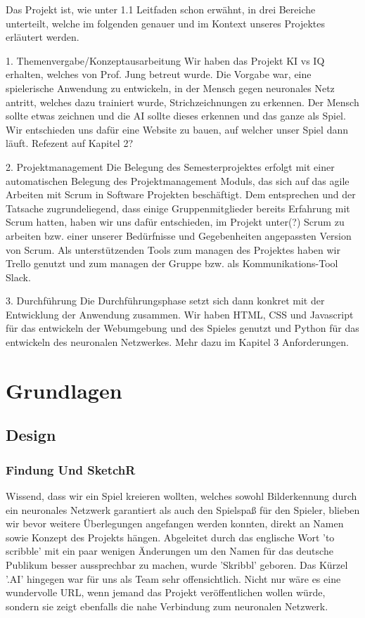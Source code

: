 \documentclass[11pt]{article}
\begin{document}
Das Projekt ist, wie unter 1.1 Leitfaden schon erwähnt, in drei Bereiche unterteilt, welche im folgenden genauer und im Kontext unseres Projektes erläutert werden.

1. Themenvergabe/Konzeptausarbeitung
	Wir haben das Projekt KI vs IQ erhalten, welches von Prof. Jung 		betreut wurde.
	Die Vorgabe war, eine spielerische Anwendung zu entwickeln, 			in der Mensch gegen neuronales Netz antritt, welches dazu 				trainiert wurde, Strichzeichnungen zu erkennen.
	Der Mensch sollte etwas zeichnen und die AI sollte dieses 				erkennen und das ganze als Spiel.
	Wir entschieden uns dafür eine Website zu bauen, auf welcher 			unser Spiel dann läuft.
	Refezent auf Kapitel 2?

2. Projektmanagement
	Die Belegung des Semesterprojektes erfolgt mit einer 						automatischen Belegung des Projektmanagement Moduls, 				das sich auf das agile Arbeiten mit Scrum in Software 				Projekten beschäftigt. Dem entsprechen und der Tatsache 				zugrundeliegend, dass einige Gruppenmitglieder bereits 					Erfahrung mit Scrum hatten, haben wir uns dafür entschieden, im 	Projekt unter(?) Scrum zu arbeiten bzw. einer unserer 						Bedürfnisse und Gegebenheiten angepassten Version von 				Scrum.
	Als unterstützenden Tools zum managen des Projektes haben wir 	Trello genutzt und zum managen der Gruppe bzw. als 						Kommunikations-Tool Slack.

3. Durchführung
	Die Durchführungsphase setzt sich dann konkret mit der 					Entwicklung der Anwendung zusammen.
	Wir haben HTML, CSS und Javascript für das entwickeln der 			Webumgebung und des Spieles genutzt und Python für das 				entwickeln des neuronalen Netzwerkes.
	Mehr dazu im Kapitel 3 Anforderungen.

\section{Grundlagen}
\subsection{Design}
\subsubsection{Findung Und SketchR}

Wissend, dass wir ein Spiel kreieren wollten, welches sowohl Bilderkennung durch ein neuronales Netzwerk garantiert als auch den Spielspaß für den Spieler, blieben wir bevor weitere Überlegungen angefangen werden konnten, direkt an Namen sowie Konzept des Projekts hängen.
Abgeleitet durch das englische Wort 'to scribble' mit ein paar wenigen Änderungen um den Namen für das deutsche Publikum besser aussprechbar zu machen, wurde 'Skribbl' geboren. Das Kürzel '.AI' hingegen war für uns als Team sehr offensichtlich. Nicht nur wäre es eine wundervolle URL, wenn jemand das Projekt veröffentlichen wollen würde, sondern sie zeigt ebenfalls die nahe Verbindung zum neuronalen Netzwerk.
\end{document}
